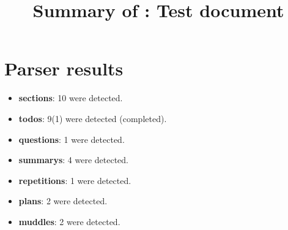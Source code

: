\title{Summary of : Test document}
\maketitle

\section{Parser results}
    \begin{itemize}[noitemsep]
\item \textbf{sections}: 10 were detected.
\item \textbf{todos}: 9(1) were detected (completed).
\item \textbf{questions}: 1 were detected.
\item \textbf{summarys}: 4 were detected.
\item \textbf{repetitions}: 1 were detected.
\item \textbf{plans}: 2 were detected.
\item \textbf{muddles}: 2 were detected.
    \end{itemize}

